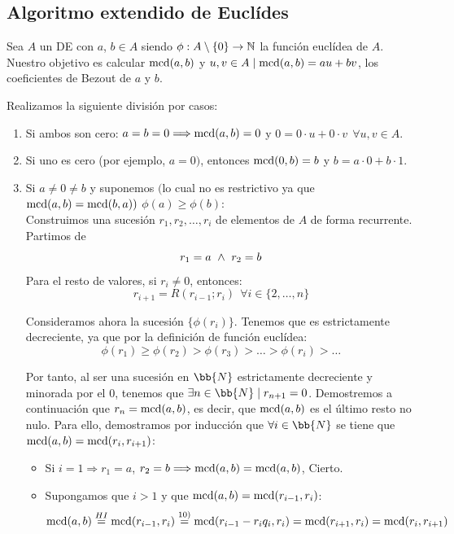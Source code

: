 \subsection{Algoritmo extendido de Euclídes}

Sea $A$ un DE con $a$, $b \in A$ siendo $\phi:A\setminus\{0\}\rightarrow\mathbb N$ la función euclídea de $A$. Nuestro objetivo es calcular $\operatorname{mcd}(a,b)$ y $u,v \in A \mid \operatorname{mcd}(a,b) = au+bv$, los coeficientes de Bezout de $a$ y $b$.

Realizamos la siguiente división por casos:
\begin{enumerate}
    \item Si ambos son cero: $a=b=0 \Longrightarrow \operatorname{mcd}(a,b)= 0 $ y $0 = 0\cdot u + 0 \cdot v~~\forall u,v \in A$.
    \item Si uno es cero (por ejemplo, $a=0)$, entonces $\operatorname{mcd}(0,b) = b$ y $b=a\cdot 0 + b \cdot 1$.

    \item Si $a \neq 0 \neq b$ y suponemos $($lo cual no es restrictivo ya que $\operatorname{mcd}(a,b)=\operatorname{mcd}(b,a))$ $\phi(a) \geq \phi(b)$:\\


    Construimos una sucesión $r_1, r_2, \ldots, r_i$ de elementos de $A$ de forma recurrente. Partimos de 
    $$r_1 = a \ \land \  r_2 = b$$
    Para el resto de valores, si $r_i \neq 0$, entonces:
    $$r_{i+1}= R(r_{i-1};r_i)~~\forall i \in \{2, \ldots, n\}$$

    Consideramos ahora la sucesión $\{\phi(r_i)\}$. Tenemos que es estrictamente decreciente, ya que por la definición de función euclídea:    
    $$\phi(r_1) \geq \phi(r_2) > \phi(r_3) > \ldots > \phi(r_i) > \ldots$$

    Por tanto, al ser una sucesión en $\bb{N}$ estrictamente decreciente y minorada por el $0$, tenemos que $\exists n\in \bb{N}\mid r_{n+1}=0$. Demostremos a continuación que $r_n = \operatorname{mcd}(a,b)$, es decir, que $\operatorname{mcd}(a,b)$ es el último resto no nulo. Para ello, demostramos por inducción que $\forall i \in \bb{N}$ se tiene que $\operatorname{mcd}(a,b) = \operatorname{mcd}(r_i, r_{i+1})$:
    \begin{itemize}
        \item Si $i=1 \Longrightarrow r_1 = a$, $r_2 = b \Longrightarrow \operatorname{mcd}(a,b) = \operatorname{mcd}(a,b)$, Cierto.
        \item Supongamos que $i>1$ y que $\operatorname{mcd}(a,b) = \operatorname{mcd}(r_{i-1}, r_i)$:
        $$\operatorname{mcd}(a,b) \stackrel{HI}{=} \operatorname{mcd}(r_{i-1}, r_i) \stackrel{10)}{=} \operatorname{mcd}(r_{i-1}-r_iq_i, r_i) = \operatorname{mcd}(r_{i+1}, r_i) = \operatorname{mcd}(r_i, r_{i+1})$$
    \end{itemize}


\end{enumerate}
